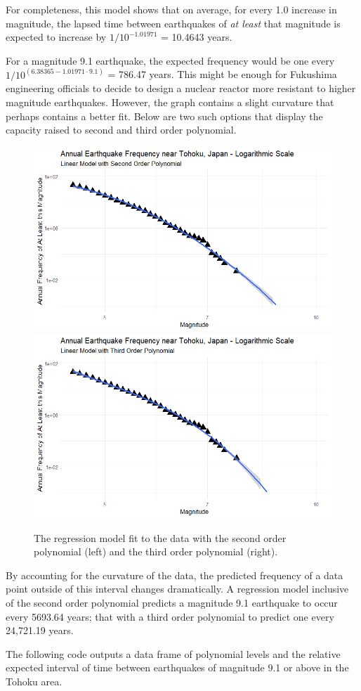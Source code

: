 For completeness, this model shows that on average, for every 1.0 increase in magnitude, the lapsed time between earthquakes of \emph{at least} that magnitude is expected to increase by \(1/10^{-1.01971}\) = 10.4643 years.

For a magnitude 9.1 earthquake, the expected frequency would be one
every \(1/10^{(6.38365 - 1.01971 \cdot 9.1)}\) = 786.47 years.  This might be enough for Fukushima engineering officials to decide to design a nuclear reactor more resistant to higher magnitude earthquakes.  However, the graph contains a slight curvature that perhaps contains a better fit.  Below are two such options that display the capacity raised to second and third order polynomial.

\begin{figure}[H]
    \includegraphics[width=0.5\linewidth]{Figures/tohoku_logscale_fit2.png}
    \includegraphics[width=0.5\linewidth]{Figures/tohoku_logscale_fit3.png}
    \caption{\footnotesize{The regression model fit to the data with the second order polynomial (left) and the third order polynomial (right).}}
    \label{tohoku_lm23}
\end{figure}

By accounting for the curvature of the data, the predicted frequency of a data point outside of this interval changes dramatically.  A regression model inclusive of the second order polynomial predicts a magnitude 9.1 earthquake to occur every 5693.64 years; that with a third order polynomial to predict one every 24,721.19 years.

The following code outputs a data frame of polynomial levels and the relative expected interval of time between earthquakes of magnitude 9.1 or above in the Tohoku area.

